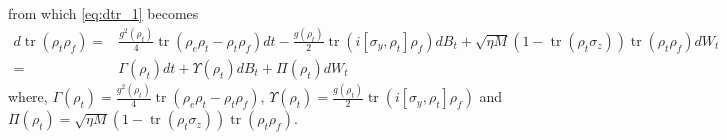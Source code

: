 \documentclass[]{elsarticle}
\begin{document}
\begin{appendices}
\begin{equation}
\end{equation}
from which \eqref{eq:dtr_1} becomes
\begin{equation}\label{eq:dtr_2}
	\begin{aligned}
		d\operatorname{tr}\left(\rho_t \rho_f\right)
		=&\frac{g^2\left(\rho_t\right)}{4}\operatorname{tr}\left(\rho_e\rho_t-\rho_t\rho_{f}\right)d t-\frac{g\left(\rho_t\right)}{2}\operatorname{tr}\left({{i}}\left[\sigma_y, \rho_t\right]\rho_{f}\right) d B_t
		+\sqrt{\eta M}\left(1-\operatorname{tr}\left(\rho_t \sigma_z\right)\right)\operatorname{tr}\left(\rho_t\rho_f\right)d W_t\\
		=&\Gamma\left(\rho_t\right) dt+\Upsilon\left(\rho_t\right)dB_{t}+\Pi\left(\rho_t\right) dW_t
	\end{aligned}
\end{equation}
where, $\Gamma\left(\rho_t\right)=\frac{g^2\left(\rho_t\right)}{4}\operatorname{tr}\left(\rho_e\rho_t-\rho_t\rho_{f}\right)$, $\Upsilon\left(\rho_t\right)=\frac{g\left(\rho_t\right)}{2}\operatorname{tr}\left({{i}}\left[\sigma_y, \rho_t\right]\rho_{f}\right)$ and $\Pi\left(\rho_t\right)=\sqrt{\eta M}\left(1-\operatorname{tr}\left(\rho_t \sigma_z\right)\right)\operatorname{tr}\left(\rho_t\rho_f\right)$. 


\end{appendices}
\end{document}
